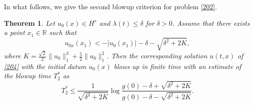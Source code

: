 \documentclass[preprint,12pt]{elsarticle}
\numberwithin{equation}{section}
\newtheorem{theorem}{Theorem}[section]
\begin{document}
In what follows, we give the second blowup criterion for problem \eqref{202}.
\begin{theorem}
\label{the207} Let $u_{0}(x)\in H^{s}$ and $\lambda(t)\leq \delta$ for $\delta>0$. Assume that there exists a point $x_{1}\in \mathbb{R}$ such that
\begin{equation}
u_{0x}(x_{1})
<-|u_{0}(x_{1})|-\delta-\sqrt{\delta^{2}+2K},
\label{2030}
\end{equation}
where $K=\frac{\sqrt{2}}{2}\|u_{0}\|^{3}_{1}+\frac{5}{2}\|u_{0}\|^{2}_{1}$.
Then the corresponding solution $u(t,x)$ of \eqref{204} with the initial datum $u_{0}(x)$ blows up in finite time with an estimate of the blowup
time $T_{2}^{\ast}$ as
$$T_{2}^{\ast}\leq\frac{1}{\sqrt{\delta^{2}+2K}}\log\frac{g(0)-\delta+\sqrt{\delta^{2}+2K}}{g(0)-\delta-\sqrt{\delta^{2}+2K}}.$$
\end{theorem}
\end{document}
